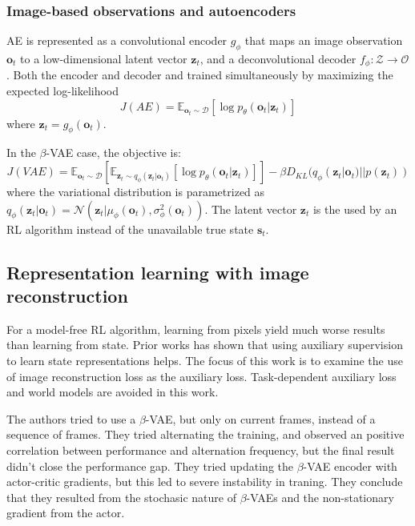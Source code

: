 \documentclass{article}
\begin{document}
\subsubsection{Image-based observations and autoencoders}
AE is represented as a convolutional encoder
$ g_{ \phi }  $ that maps an image observation $ \bm{o}_{t}  $
to a low-dimensional latent vector $ \bm{z}_{t}  $,
and a deconvolutional decoder $ f_{ \phi } : \mathcal{Z} \to \mathcal{O} $ .
Both the encoder and decoder and trained simultaneously by maximizing the
expected log-likelihood
\begin{equation}
		J (AE) = \mathbb{E}_{ \bm{o}_{t} \sim \mathcal{D} } 
		\left[ \log p_{ \theta } (\bm{o}_{t}| \bm{z}_{t}) \right] 
\end{equation}
where $ \bm{z}_{t} = g_{ \phi } (\bm{o}_{t})  $.

In the $ \beta  $-VAE case, the objective is:
\begin{equation}
		J (VAE) = \mathbb{E}_{ \bm{o}_{t} \sim \mathcal{D} }
		\left[ \mathbb{E}_{ \bm{z}_{t} \sim q_{ \phi } (\bm{z}_{t}|\bm{o}_{t}) } 
\left[ \log p_{ \theta } (\bm{o}_{t}|\bm{z}_{t}) \right] 
		\right] 
		- \beta D_{ KL } (q_{ \phi } (\bm{z}_{t}|\bm{o}_{t}) || p (\bm{z}_{t}))
\end{equation}
where the variational distribution is parametrized as
$ q_{ \phi } (\bm{z}_{t}|\bm{o}_{t}) = 
\mathcal{N} (\bm{z}_{t}|\mu_{ \phi } (\bm{o}_{t}), \sigma^{ 2 }_{ \phi } (\bm{o}_{t}))  $.
The latent vector $ \bm{z}_{t}  $ is the used by an RL algorithm instead of
the unavailable true state $ \bm{s}_{t}  $.

\subsection{Representation learning with image reconstruction}
For a model-free RL algorithm, learning from pixels yield much worse results
than learning from state.
Prior works has shown that using auxiliary supervision to learn state representations
helps.
The focus of this work is to examine the use of image reconstruction loss as the auxiliary loss.
Task-dependent auxiliary loss and world models are avoided in this work.

The authors tried to use a $ \beta  $-VAE, but only on current frames,
instead of a sequence of frames.
They tried alternating the training, and observed an positive correlation between 
performance and alternation frequency, but the final result didn't close the performance gap.
They tried updating the $ \beta  $-VAE encoder with actor-critic gradients,
but this led to severe instability in traning.
They conclude that they resulted from the stochasic nature of 
$ \beta  $-VAEs and the non-stationary gradient from the actor.
\end{document}
